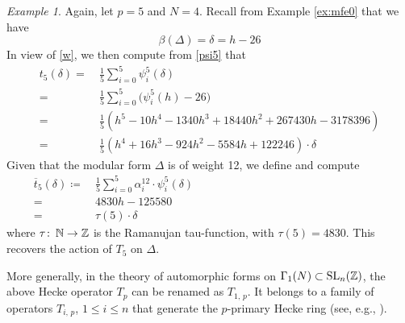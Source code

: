 \documentclass{gtpart}
\theoremstyle{definition}
\theoremstyle{remark}
\newtheorem{ex}[thm]{Example}
\def\co{\colon\thinspace}
\newcommand{\mb}[1]{\mathbb{#1}}
\newcommand{\BN}{{\mb N}}
\newcommand{\BZ}{{\mb Z}}
\newcommand{\A}{\alpha}
\newcommand{\B}{\beta}
\renewcommand{\D}{\Delta}
\renewcommand{\d}{\delta}
\newcommand{\G}{\Gamma}
\newcommand{\T}{\tau}
\newcommand{\ce}{\coloneqq}
\renewcommand{\=}{\approx}
\renewcommand{\-}{\sim}
\newcommand{\SL}{{\rm SL}}
\numberwithin{equation}{section}
\numberwithin{thm}{section}
\begin{document}
\begin{ex}
 \label{ex:ho}
 Again, let $p = 5$ and $N = 4$.  
 Recall from Example \ref{ex:mfe0} that we have 
 \[
  \B(\D) = \d = h - 26 
 \]
 In view of \eqref{w}, we then compute from \eqref{psi5} that 
 \begin{equation*}
  \begin{split}
   t_5(\d) = & ~ \frac{1}{5} \sum_{i=0}^5 \psi^5_i(\d) \\
           = & ~ \frac{1}{5} \sum_{i=0}^5 \big(\psi^5_i(h) - 26\big) \\
           = & ~ \frac{1}{5} (h^5 - 10 h^4 - 1340 h^3 + 18440 h^2 + 267430 h - 3178396) \\
           = & ~ \frac{1}{5} (h^4 + 16 h^3 - 924 h^2 - 5584 h + 122246) \cdot \d 
  \end{split}
 \end{equation*}
 Given that the modular form $\D$ is of weight 12, we define and compute 
 \begin{equation*}
  \begin{split}
   \overline{t}_5(\d) \ce & ~ \frac{1}{5} \sum_{i=0}^5 \A_i^{12} \cdot \psi^5_i(\d) \qquad\qquad\qquad\qquad\qquad\qquad\qquad\qquad\quad \\
                        = & ~ 4830 h - 125580 \\
                        = & ~ \T(5) \cdot \d 
  \end{split}
 \end{equation*}
 where $\T \co \BN \to \BZ$ is the Ramanujan tau-function, with $\T(5) = 4830$.  
 This recovers the action of $T_5$ on $\D$.  
\end{ex}

More generally, in the theory of automorphic forms on $\G_1(N) \subset \SL_n(\BZ)$, 
the above Hecke operator $T_p$ can be renamed as $T_{1,\,p}$.  
It belongs to a family of operators $T_{i,\,p}$, $1 \leq i \leq n$ 
that generate the $p$-primary Hecke ring (see, e.g., \cite[Theorem 3.20]{AF}).  
\end{document}
